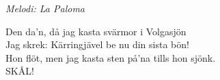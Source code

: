 {\footnotesize\textit{Melodi: La Paloma}}\par
\vspace{10pt}
Den da'n, då jag kasta svärmor i Volgasjön\\
Jag skrek: Kärringjävel be nu din sista bön! \\
Hon flöt, men jag kasta sten på'na tills hon sjönk.\\
SKÅL!
